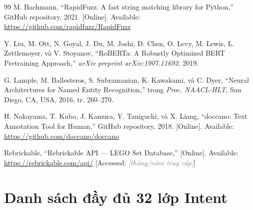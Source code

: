 \documentclass[12pt, a4paper]{report}
\newcommand{\placeholder}[1]{\textit{\textcolor{gray}{[#1]}}}
\begin{document}
\begin{thebibliography}{99}
M. Bachmann,
``RapidFuzz: A fast string matching library for Python,''
GitHub repository, 2021.
[Online]. Available: \url{https://github.com/rapidfuzz/RapidFuzz}

Y. Liu, M. Ott, N. Goyal, J. Du, M. Joshi, D. Chen, O. Levy,
M. Lewis, L. Zettlemoyer, và V. Stoyanov,
``RoBERTa: A Robustly Optimized BERT Pretraining Approach,''
\textit{arXiv preprint arXiv:1907.11692}, 2019.

G. Lample, M. Ballesteros, S. Subramanian, K. Kawakami, và C. Dyer,
``Neural Architectures for Named Entity Recognition,''
trong \textit{Proc. NAACL-HLT}, San Diego, CA, USA, 2016, tr. 260--270.

H. Nakayama, T. Kubo, J. Kamura, Y. Taniguchi, và X. Liang,
``doccano: Text Annotation Tool for Human,''
GitHub repository, 2018.
[Online]. Available: \url{https://github.com/doccano/doccano}

Rebrickable,
``Rebrickable API --- LEGO Set Database,''
[Online]. Available: \url{https://rebrickable.com/api/}
[Accessed: \placeholder{tháng/năm truy cập}]

\end{thebibliography}

\appendix

\chapter{Danh sách đầy đủ 32 lớp Intent}
\label{app:intents}
\end{document}
